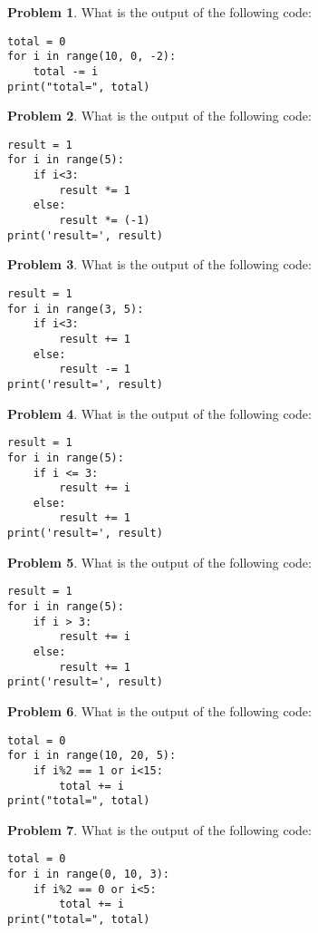 \documentclass[10pt]{article}
\theoremstyle{definition}
\newtheorem{problem}{Problem}
\begin{document}
\begin{problem}
    What is the output of the following code:
\end{problem}
\begin{lstlisting}
total = 0
for i in range(10, 0, -2):
    total -= i
print("total=", total)
\end{lstlisting}
\vspace{0.1in}



\begin{problem}
    What is the output of the following code:
\end{problem}
\begin{lstlisting}
result = 1
for i in range(5):
    if i<3:
        result *= 1
    else:
        result *= (-1)
print('result=', result)
\end{lstlisting}
\vspace{0.1in}

\newpage
\begin{problem}
    What is the output of the following code:
\end{problem}
\begin{lstlisting}
result = 1
for i in range(3, 5):
    if i<3:
        result += 1
    else:
        result -= 1
print('result=', result)
\end{lstlisting}
\vspace{0.1in}



\begin{problem}
    What is the output of the following code:
\end{problem}
\begin{lstlisting}
result = 1
for i in range(5):
    if i <= 3:
        result += i
    else:
        result += 1
print('result=', result)
\end{lstlisting}
\vspace{0.1in}

\begin{problem}
    What is the output of the following code:
\end{problem}
\begin{lstlisting}
result = 1
for i in range(5):
    if i > 3:
        result += i
    else:
        result += 1
print('result=', result)
\end{lstlisting}
\vspace{0.1in}

\begin{problem}
    What is the output of the following code:
\end{problem}
\begin{lstlisting}
total = 0
for i in range(10, 20, 5):
    if i%2 == 1 or i<15:
        total += i
print("total=", total)
\end{lstlisting}
\vspace{0.1in}



\begin{problem}
    What is the output of the following code:
\end{problem}
\begin{lstlisting}
total = 0
for i in range(0, 10, 3):
    if i%2 == 0 or i<5:
        total += i
print("total=", total)
\end{lstlisting}
\vspace{0.1in}
\end{document}
